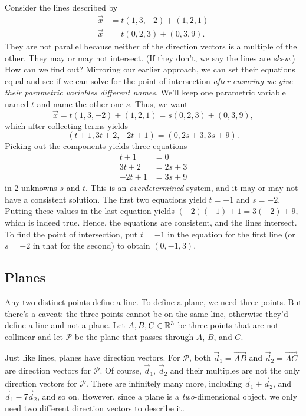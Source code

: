 \begin{example}
Consider the lines described by
\begin{align*}
	\vec x &= t(1, 3, -2 ) + ( 1, 2, 1 ) \\
	\vec x &= t( 0, 2, 3) + ( 0, 3, 9 ).
\end{align*}
They are not parallel because neither of the direction
vectors is a multiple
of the other.  They may or may not intersect.  (If they don't,
	we say the lines are \emph{skew}.)  How can we find out?  
	Mirroring our earlier approach, 
	we can set their equations equal and see if we can solve for the point
	of intersection \emph{after ensuring we give their parametric variables
	different names}.   We'll keep one parametric variable named $t$ and name the
	other one $s$.  Thus, we want
\[
\vec x = t( 1, 3, -2 ) + ( 1, 2, 1 ) =
s( 0, 2, 3) + ( 0, 3, 9 ),
\]
which after collecting terms yields
\[
    ( t + 1, 3t + 2, -2t + 1 ) = ( 0, 2s + 3, 3s + 9).
\]
Picking out the components yields three equations
\begin{align*}
    t + 1 &= 0 \\
    3t +2 &= 2s + 3 \\
    -2t + 1 &=  3s + 9
\end{align*}
in 2 unknowns  $s$ and $t$.  This is an {\it overdetermined\/}
system, and it may or may not have a consistent solution.  
The first two equations yield $t = -1$  and $s = -2$.  Putting
these values in the last equation yields $(-2)(-1) + 1 = 3(-2) + 9$,
which is indeed true.
Hence, the equations are consistent, and the lines
intersect.   To find the point of intersection, put $t = -1$
in the equation for the first line (or
$s = -2$ in that for the second) to obtain  $( 0, -1, 3 )$.  
\end{example}

\subsection{Planes}

Any two distinct points define a line.  To define a plane, we
need three points.  But there's a caveat: the three points cannot
be on the same line, otherwise they'd define a line
and not a plane.  Let $A,B,C\in\mathbb{R}^3$ be three points that are not
collinear and let $\mathcal P$ be the plane that passes through $A$,
$B$, and $C$.

Just like lines, planes have direction vectors.  For $\mathcal P$, both
$\vec d_1=\overrightarrow{AB}$ and $\vec d_2=\overrightarrow{AC}$ are direction
vectors for $\mathcal P$.  Of course, $\vec d_1$, $\vec d_2$ and their multiples
are not the only direction vectors for $\mathcal P$. There are infinitely many more, including
$\vec d_1+\vec d_2$, and $\vec d_1-7\vec d_2$, and so on.  However, since a plane
is a \emph{two}-dimensional object, we only need two different direction vectors to describe it.


